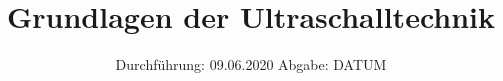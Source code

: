 

\subject{901}
\title{Grundlagen der Ultraschalltechnik}
\date{%
  Durchführung: 09.06.2020
  \hspace{3em}
  Abgabe: DATUM
}



\maketitle
\thispagestyle{empty}
\tableofcontents
\newpage






\nocite{V901}

\printbibliography{}


